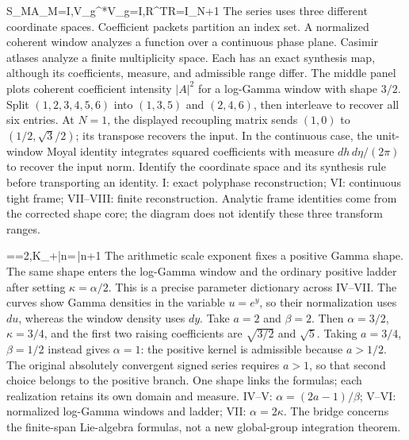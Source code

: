 
{\mathcal S_M\mathcal A_M=I,\qquad \mathcal V_g^*\mathcal V_g=I,\qquad R^{\mathsf T}R=I_{N+1}}
{The series uses three different coordinate spaces. Coefficient packets partition an index set. A normalized coherent window analyzes a function over a continuous phase plane. Casimir atlases analyze a finite multiplicity space. Each has an exact synthesis map, although its coefficients, measure, and admissible range differ. The middle panel plots coherent coefficient intensity $|A|^2$ for a log-Gamma window with shape $3/2$.}
{Split $(1,2,3,4,5,6)$ into $(1,3,5)$ and $(2,4,6)$, then interleave to recover all six entries. At $N=1$, the displayed recoupling matrix sends $(1,0)$ to $(1/2,\sqrt3/2)$; its transpose recovers the input. In the continuous case, the unit-window Moyal identity integrates squared coefficients with measure $dh\,d\eta/(2\pi)$ to recover the input norm.}
{Identify the coordinate space and its synthesis rule before transporting an identity.}
{I: exact polyphase reconstruction; VI: continuous tight frame; VII--VIII: finite reconstruction. Analytic frame identities come from the corrected shape core; the diagram does not identify these three transform ranges.}

{\alpha==2\kappa,\qquad K_+|n\rangle=\,|n+1\rangle}
{The arithmetic scale exponent fixes a positive Gamma shape. The same shape enters the log-Gamma window and the ordinary positive ladder after setting $\kappa=\alpha/2$. This is a precise parameter dictionary across IV--VII. The curves show Gamma densities in the variable $u=e^y$, so their normalization uses $du$, whereas the window density uses $dy$.}
{Take $a=2$ and $\beta=2$. Then $\alpha=3/2$, $\kappa=3/4$, and the first two raising coefficients are $\sqrt{3/2}$ and $\sqrt5$. Taking $a=3/4$, $\beta=1/2$ instead gives $\alpha=1$: the positive kernel is admissible because $a>1/2$. The original absolutely convergent signed series requires $a>1$, so that second choice belongs to the positive branch.}
{One shape links the formulas; each realization retains its own domain and measure.}
{IV--V: $\alpha=(2a-1)/\beta$; V--VI: normalized log-Gamma windows and ladder; VII: $\alpha=2\kappa$. The bridge concerns the finite-span Lie-algebra formulas, not a new global-group integration theorem.}

